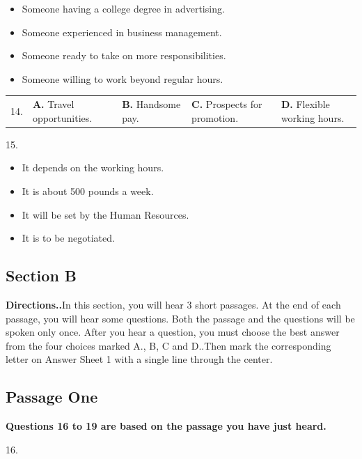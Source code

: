 \documentclass[UTF8,11pt]{ctexart}
\begin{document}
\begin{itemize}[leftmargin=2em,itemsep=.2em,topsep=.4em]\item[A.] Someone having a college degree in advertising.
\item[B.] Someone experienced in business management.
\item[C.] Someone ready to take on more responsibilities.
\item[D.] Someone willing to work beyond regular hours.
\end{itemize}

\noindent\begin{tabularx}{\linewidth}{@{}lXXXX@{}}14. & \textbf{A.} Travel opportunities. & \textbf{B.} Handsome pay. & \textbf{C.} Prospects for promotion. & \textbf{D.} Flexible working hours.\\\end{tabularx}\par

15.


\begin{itemize}[leftmargin=2em,itemsep=.2em,topsep=.4em]\item[A.] It depends on the working hours.
\item[B.] It is about 500 pounds a week.
\item[C.] It will be set by the Human Resources.
\item[D.] It is to be negotiated.
\end{itemize}

\subsection*{\textbf{Section B}}


\textbf{Directions..}In this section, you will hear 3 short passages. At the end of each passage, you will hear some questions. Both the passage and the questions will be spoken only once. After you hear a question, you must choose the best answer from the four choices marked A., B, C and D..Then mark the corresponding letter on Answer Sheet 1 with a single line through the center.


\subsection*{Passage One}


\textbf{Questions 16 to 19 are based on the passage you have just heard.}


16.
\end{document}
